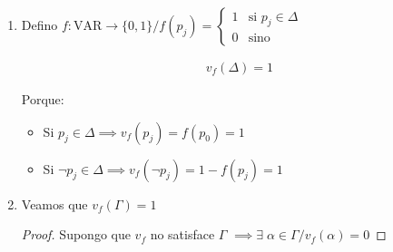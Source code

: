 \begin{itemize}[align=right]
\begin{enumerate}
\begin{proof}
\begin{itemize}
                \item \begin{align*}
                \text{Si } \Gamma \cup \Delta_j \cup \{ p_j \}
                \text{ no es f.s.} \implies& \Delta_{j+1} 
                = \Delta_j \cup \{ \neg p_j \} \\
                \implies& \neg p_j \in \Delta_{j+1} \subseteq \Delta
            \end{align*}            
            
            \end{itemize}
            \end{proof}

            \item Defino $f:\mathrm{VAR} \to \{ 0,1 \} / f(p_j) = \begin{cases}
                    1 & \text{si } p_j \in \Delta \\
                    0 & \text{sino}
                    \end{cases}$

                \begin{gather*}
                    v_f(\Delta)=1
                \end{gather*}

                Porque:
                
                \begin{itemize}
                    \item Si  $p_j \in \Delta \implies v_f(p_j) = f(p_0)=1$
                
                    \item Si 
                    $\neg p_j \in \Delta \implies v_f(\neg p_j) = 1 - f(p_j)=1$
                \end{itemize}

            \item Veamos que $v_f(\Gamma)=1$

                \begin{proof} \phantom{.}
                
                    Supongo que $v_f$ no satisface $\Gamma$
                    $\implies \exists \; \alpha \in \Gamma / v_f(\alpha)=0$


\end{proof}
\end{enumerate}
\end{itemize}
